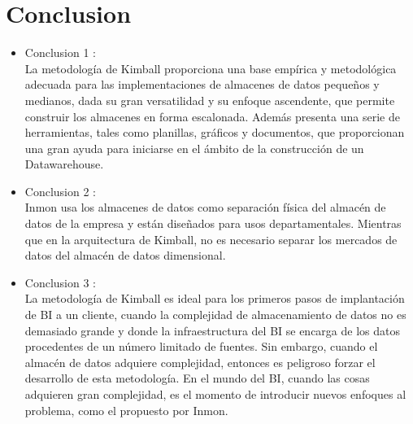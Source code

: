 \documentclass[preprint,12pt]{elsarticle}
\begin{document}
\section{Conclusion}
\begin{itemize}
\item Conclusion 1 : \\
La metodología de Kimball proporciona una base empírica y
metodológica adecuada para las implementaciones de almacenes de
datos pequeños y medianos, dada su gran versatilidad y su enfoque
ascendente, que permite construir los almacenes en forma escalonada.
Además presenta una serie de herramientas, tales como planillas,
gráficos y documentos, que proporcionan una gran ayuda para iniciarse
en el ámbito de la construcción de un Datawarehouse. 
\item Conclusion 2 : \\
Inmon usa los almacenes de datos como separación física del almacén de datos de la empresa y están diseñados para usos departamentales. Mientras que en la arquitectura de Kimball, no es necesario separar los mercados de datos del almacén de datos dimensional.
\item Conclusion 3 : \\
La metodología de Kimball es ideal para los primeros pasos de implantación de BI a un cliente, cuando la complejidad de almacenamiento de datos no es demasiado grande y donde la infraestructura del BI se encarga de los datos procedentes de un número limitado de fuentes. Sin embargo, cuando el almacén de datos adquiere complejidad, entonces es peligroso forzar el desarrollo de esta metodología. En el mundo del BI, cuando las cosas adquieren gran complejidad, es el momento de introducir nuevos enfoques al problema, como el propuesto por Inmon.


\end{itemize}

	\newpage
	
		 
	\citep{silva2017gestion}  
\citep{rivadera2010metodologia}  
\citep{leonard2013metodologias}
\end{document}
